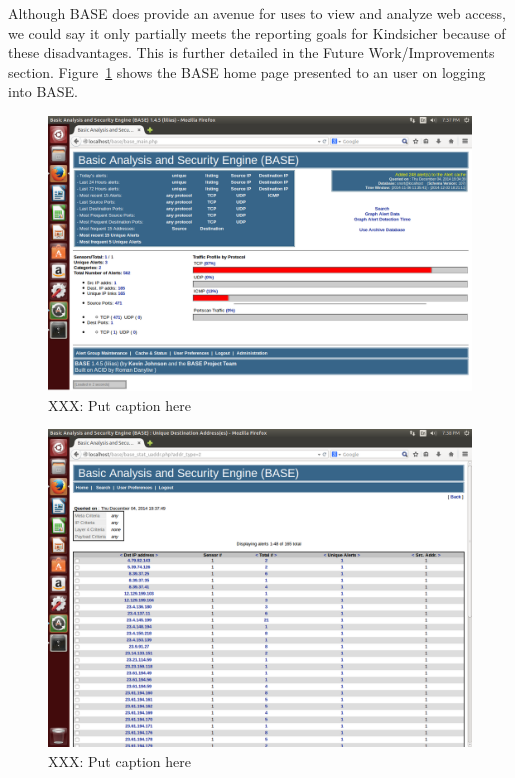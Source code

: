 Although BASE does provide an avenue for uses to view and analyze web
access, we could say it only partially meets the reporting goals for
Kindsicher because of these disadvantages. 
%
This is further detailed in the Future Work/Improvements section.
%
Figure~\ref{fig:r2} shows the BASE home page presented to an user on logging into BASE.

\begin{figure}[!t]
    \centering
    \includegraphics[width=\columnwidth]{figures/R2_BASE_Main}
    \caption{XXX: Put caption here}
    \label{fig:r2}
\end{figure}

\begin{figure}[!t]
    \centering
    \includegraphics[width=\columnwidth]{figures/R3_BASE_IPList}
    \caption{XXX: Put caption here}
    \label{fig:r3}
\end{figure}

